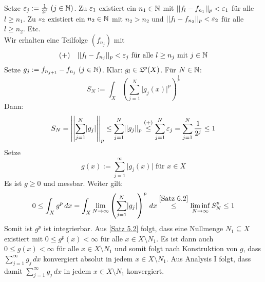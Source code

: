 \documentclass[a4paper,twoside,DIV15,BCOR12mm,chapterprefix=true,headings=onelinechapter]{scrbook}
\begin{document}
\begin{beweis}
Setze \(\ep_j:=\frac1{2^j}\ (j\in\mdn)\). 
Zu \(\varepsilon_1\) existiert ein \(n_1\in\mathbb{N}\) mit \(\lvert\lvert f_l-f_{n_1}\rvert\rvert_p<\varepsilon_1\) 
für alle \(l\geq n_1\). 
Zu \(\varepsilon_2\) existiert ein \(n_2\in\mathbb{N}\) mit \(n_2>n_2\) und 
\(\lvert\lvert f_l-f_{n_2}\rvert\rvert_p<\varepsilon_2\) für alle \(l\geq n_2\).
Etc.\\
Wir erhalten eine Teilfolge \((f_{n_j})\) mit 
\[(+)\ \ \ \lvert\lvert f_l-f_{n_j}\rvert\rvert_p<\varepsilon_j \text{ für alle } l\geq n_j \text{ mit } j\in\mathbb{N}\]
Setze \(g_j:=f_{n_{j+1}}-f_{n_j}\ (j\in\mathbb{N})\). Klar: \(g_l\in\mathfrak{L}^p(X)\).
Für \(N\in\mathbb{N}\): \[S_N:=\int_X\left(\sum^N_{j=1}\lvert g_j(x)\rvert^p\right)^{\frac1p}\]
Dann:
\begin{align*}
	S_N=\left\lvert\left\lvert\sum^N_{j=1}\lvert g_j\rvert\right\rvert\right\rvert_p 
	\leq \sum^N_{j=1}\lvert\lvert g_j\rvert\rvert_p
	\overset{\text{(+)}}\leq \sum^N_{j=1}\varepsilon_j
	=\sum^N_{j=1}\frac1{2^j}
	\leq 1
\end{align*}
Setze \[g(x):=\sum^\infty_{j=1}\lvert g_j(x)\rvert \text{ für } x\in X\]
Es ist \(g\geq0\) und messbar. Weiter gilt:
\begin{align*}
	0\leq \int_X g^p\,dx
	=\int_X\lim_{N\to\infty}\left(\sum^N_{j=1}\lvert g_j\rvert\right)^p\,dx
	\overset{\ref{Satz 6.2}}\leq \liminf_{N\to\infty}S_N^p
	\leq 1
\end{align*}
Somit ist \(g^p\) ist integrierbar. Aus \ref{Satz 5.2} folgt, dass eine Nullmenge \(N_1\subseteq X\)
existiert mit \(0\leq g^p(x)<\infty\) für alle \(x\in X\setminus N_1\). Es ist dann auch
\(0\leq g(x)<\infty\) für alle \(x\in X\setminus N_1\) und somit folgt nach Konstruktion von $g$, dass
\(\sum^\infty_{j=1}g_j\,dx\) konvergiert absolut in jedem \(x\in X\setminus N_1\).
Aus Analysis I folgt, dass damit \(\sum^\infty_{j=1}g_j\,dx\) in jedem 
\(x\in X\setminus N_1\) konvergiert.


\end{beweis}
\end{document}
